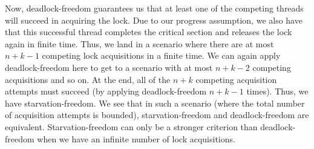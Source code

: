 \documentclass{article}
\begin{document}
    Now, deadlock-freedom guarantees us that at least one of the competing threads will succeed in acquiring the lock. Due to our progress assumption, we also have that this successful thread completes the critical section and releases the lock again in finite time. Thus, we land in a scenario where there are at most $n+k-1$ competing lock acquisitions in a finite time. We can again apply deadlock-freedom here to get to a scenario with at most $n+k-2$ competing acquisitions and so on. At the end, all of the $n+k$ competing acquisition attempts must succeed (by applying deadlock-freedom $n+k-1$ times). Thus, we have starvation-freedom. We see that in such a scenario (where the total number of acquisition attempts is bounded), starvation-freedom and deadlock-freedom are equivalent. Starvation-freedom can only be a stronger criterion than deadlock-freedom when we have an infinite number of lock acquisitions.

\end{document}
